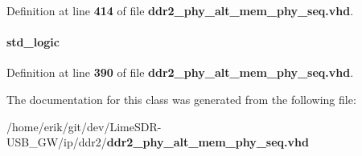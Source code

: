 Definition at line {\bf 414} of file {\bf ddr2\+\_\+phy\+\_\+alt\+\_\+mem\+\_\+phy\+\_\+seq.\+vhd}.

\paragraph[{write\+\_\+mtp\+\_\+dis}]{ {\bfseries \textcolor{comment}{std\+\_\+logic}\textcolor{vhdlchar}{ }} \hspace{0.3cm}{\ttfamily [Record]}}\label{classddr2__phy__alt__mem__phy__record__pkg_a1f54589fbe1d53d38297412412fc3db8}


Definition at line {\bf 390} of file {\bf ddr2\+\_\+phy\+\_\+alt\+\_\+mem\+\_\+phy\+\_\+seq.\+vhd}.



The documentation for this class was generated from the following file\+:\begin{DoxyCompactItemize}
\item 
/home/erik/git/dev/\+Lime\+S\+D\+R-\/\+U\+S\+B\+\_\+\+G\+W/ip/ddr2/{\bf ddr2\+\_\+phy\+\_\+alt\+\_\+mem\+\_\+phy\+\_\+seq.\+vhd}\end{DoxyCompactItemize}
